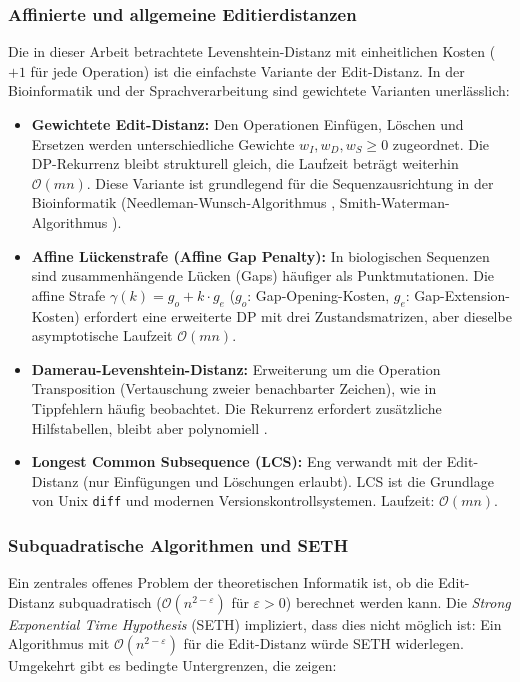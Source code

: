 ﻿\documentclass[a4paper,12pt]{article}
\theoremstyle{definition}
\begin{document}
\subsubsection{Affinierte und allgemeine Editierdistanzen}

Die in dieser Arbeit betrachtete Levenshtein-Distanz mit einheitlichen Kosten ($+1$
für jede Operation) ist die einfachste Variante der Edit-Distanz. In der Bioinformatik
und der Sprachverarbeitung sind gewichtete Varianten unerlässlich:

\begin{itemize}
    \item \textbf{Gewichtete Edit-Distanz:} Den Operationen Einfügen, Löschen und
          Ersetzen werden unterschiedliche Gewichte $w_I, w_D, w_S \geq 0$ zugeordnet.
          Die DP-Rekurrenz bleibt strukturell gleich, die Laufzeit beträgt weiterhin
          $\mathcal{O}(mn)$. Diese Variante ist grundlegend für die Sequenzausrichtung
          in der Bioinformatik (Needleman-Wunsch-Algorithmus \cite{needleman1970},
          Smith-Waterman-Algorithmus \cite{smith1981}).
    \item \textbf{Affine Lückenstrafe (Affine Gap Penalty):} In biologischen
          Sequenzen sind zusammenhängende Lücken (Gaps) häufiger als Punktmutationen.
          Die affine Strafe $\gamma(k) = g_o + k \cdot g_e$ ($g_o$: Gap-Opening-Kosten,
          $g_e$: Gap-Extension-Kosten) erfordert eine erweiterte DP mit drei
          Zustandsmatrizen, aber dieselbe asymptotische Laufzeit $\mathcal{O}(mn)$.
    \item \textbf{Damerau-Levenshtein-Distanz:} Erweiterung um die Operation
          Transposition (Vertauschung zweier benachbarter Zeichen), wie in
          Tippfehlern häufig beobachtet. Die Rekurrenz erfordert zusätzliche
          Hilfstabellen, bleibt aber polynomiell \cite{damerau1964}.
    \item \textbf{Longest Common Subsequence (LCS):} Eng verwandt mit der
          Edit-Distanz (nur Einfügungen und Löschungen erlaubt). LCS ist die
          Grundlage von Unix \texttt{diff} und modernen Versionskontrollsystemen.
          Laufzeit: $\mathcal{O}(mn)$.
\end{itemize}

\subsubsection{Subquadratische Algorithmen und SETH}

Ein zentrales offenes Problem der theoretischen Informatik ist, ob die
Edit-Distanz subquadratisch ($\mathcal{O}(n^{2-\varepsilon})$ für $\varepsilon > 0$)
berechnet werden kann. Die \emph{Strong Exponential Time Hypothesis} (SETH)
\cite{williams2005} impliziert, dass dies nicht möglich ist: Ein Algorithmus mit
$\mathcal{O}(n^{2-\varepsilon})$ für die Edit-Distanz würde SETH widerlegen.
Umgekehrt gibt es bedingte Untergrenzen, die zeigen:
\end{document}
